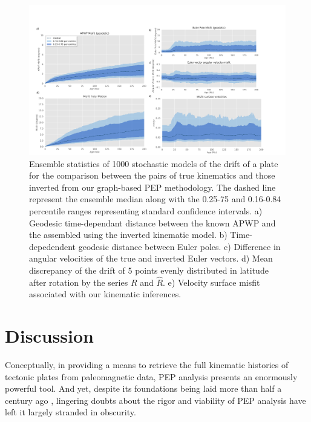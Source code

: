 \documentclass{article} %
\begin{document}
\begin{figure}
\begin{centering}
\includegraphics[scale=0.35]{ensemble-statistics.png}

\caption{\small Ensemble statistics of 1000 stochastic models of the drift of a plate for the comparison between the pairs of true kinematics and those inverted from our graph-based PEP methodology. The dashed line represent the ensemble median along with the 0.25-75 and 0.16-0.84 percentile ranges representing standard confidence intervals. a) Geodesic time-dependant distance between the known APWP and the assembled using the inverted kinematic model. b) Time-depedendent geodesic distance between Euler poles. c) Difference in angular velocities of the true and inverted Euler vectors. d)  Mean discrepancy of the drift of 5 points evenly distributed in latitude after rotation by the series $R$ and $\hat{R}$. e) Velocity surface misfit associated with our kinematic inferences.}

\label{fig:ensemble}
\end{centering}
\end{figure}

\section{Discussion}

Conceptually, in providing a means to retrieve the full kinematic histories of tectonic plates from paleomagnetic data, PEP analysis presents an enormously powerful tool. And yet, despite its foundations being laid more than half a century ago \citep{francheteau1969paleomagnetism}, lingering doubts about the rigor and viability of PEP analysis have left it largely stranded in obscurity.
\end{document}

